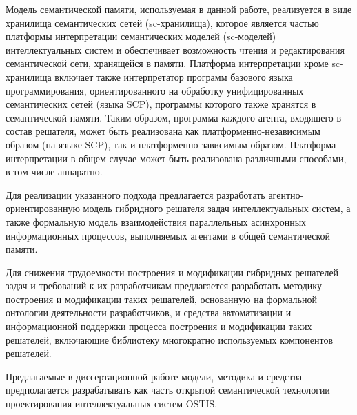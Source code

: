 \documentclass{thesisby}
\begin{document}
Модель семантической памяти, используемая в данной работе, реализуется в виде хранилища семантических сетей (sc-хранилища), которое является частью платформы интерпретации семантических моделей (sc-моделей) интеллектуальных систем и обеспечивает возможность чтения и редактирования семантической сети, хранящейся в памяти. Платформа интерпретации кроме sc-хранилища включает также интерпретатор программ базового языка программирования, ориентированного на обработку унифицированных семантических сетей (языка SCP), программы которого также хранятся в семантической памяти. Таким образом, программа каждого агента, входящего в состав решателя, может быть реализована как платформенно-независимым образом (на языке SCP), так и платформенно-зависимым образом. Платформа интерпретации в общем случае может быть реализована различными способами, в том числе аппаратно.

Для реализации указанного подхода предлагается разработать агентно-ориентированную модель гибридного решателя задач интеллектуальных систем, а также формальную модель взаимодействия параллельных асинхронных информационных процессов, выполняемых агентами в общей семантической памяти.

Для снижения трудоемкости построения и модификации гибридных решателей задач и требований к их разработчикам предлагается разработать методику построения и модификации таких решателей, основанную на формальной онтологии деятельности разработчиков, и средства автоматизации и информационной поддержки процесса построения и модификации таких решателей, включающие библиотеку многократно используемых компонентов решателей. 

Предлагаемые в диссертационной работе модели, методика и средства предполагается разрабатывать как часть открытой семантической технологии проектирования интеллектуальных систем OSTIS.

\iffalse
\begin{figure}[H]
  \centering
  \texttt{[image: man-source/images/ch1/pic1\_4\_left.png]}
  \caption{Структура диссертационной работы}
  \label{fig:pic1_4}
\end{figure}
\fi
\end{document}

